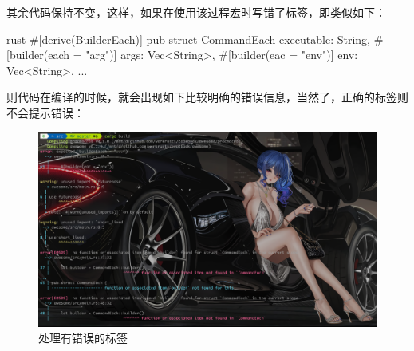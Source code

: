 其余代码保持不变，这样，如果在使用该过程宏时写错了标签，即类似如下：
\begin{code-block}{rust}
#[derive(BuilderEach)]
pub struct CommandEach {
    executable: String,
    #[builder(each = "arg")]
    args: Vec<String>,
    #[builder(eac = "env")]
    env: Vec<String>,
    ...
}
\end{code-block}
则代码在编译的时候，就会出现如下比较明确的错误信息，当然了，正确的标签则不会提示错误：
\begin{figure}[H]
  \centering
  \includegraphics[width=\linewidth]{rust_label_error.png}
  \caption{处理有错误的标签}
  \label{fig:rust_label_error}
\end{figure}

